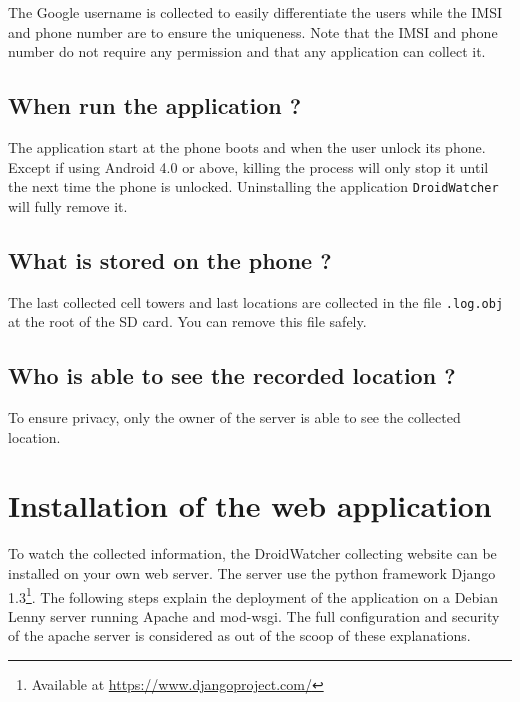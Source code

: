 The Google username is collected to easily differentiate the users while the IMSI and phone number are to ensure the uniqueness.
Note that the IMSI and phone number do not require any permission and that any application can collect it.

\subsection{When run the application ?}

The application start at the phone boots and when the user unlock its phone.
Except if using Android 4.0 or above, killing the process will only stop it until the next time the phone is unlocked.
Uninstalling the application \texttt{DroidWatcher} will fully remove it.

\subsection{What is stored on the phone ?}

The last collected cell towers and last locations are collected in the file \texttt{.log.obj} at the root of the SD card. You can remove this file safely.

\subsection{Who is able to see the recorded location ?}

To ensure privacy, only the owner of the server is able to see the collected location.

\section{Installation of the web application}

To watch the collected information, the DroidWatcher collecting website can be installed on your own web server.
The server use the python framework Django 1.3\footnote{Available at \url{https://www.djangoproject.com/}}.
The following steps explain the deployment of the application on a Debian Lenny server running Apache and mod-wsgi. The full configuration and security of the apache server is considered as out of the scoop of these explanations.

